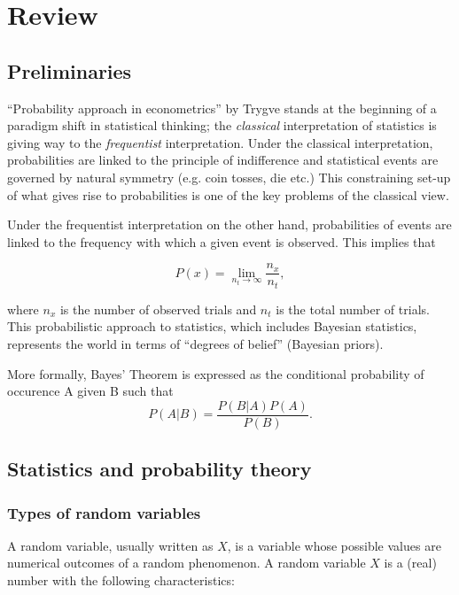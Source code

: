 \chapter{Review}\label{chap_Review}
\section{Preliminaries}\label{chap_Review:Prelim}
``Probability approach in econometrics'' by Trygve \citet{Haavelmo1944} stands at the beginning of a paradigm shift in statistical thinking; the \emph{classical} interpretation of statistics is giving way to the \emph{frequentist} interpretation. Under the classical interpretation, probabilities are linked to the principle of indifference and statistical events are governed by natural symmetry (e.g. coin tosses, die etc.) This constraining set-up of what gives rise to probabilities is one of the key problems of the classical view. 

Under the frequentist interpretation on the other hand, probabilities of events are linked to the frequency with which a given event is observed. This implies that

$$P(x)= \lim\limits_{n_{t} \rightarrow \infty} \frac{n_{x}}{n_{t}},$$ 

where $n_{x}$ is the number of observed trials and $n_{t}$ is the total number of trials. This probabilistic approach to statistics, which includes Bayesian statistics, represents the world in terms of ``degrees of belief'' (Bayesian priors).

More formally, Bayes' Theorem is expressed as the conditional probability of occurence A given B such that $$P(A|B) = \frac{P(B|A)P(A)}{P(B)}.$$


\section{Statistics and probability theory}\label{chap_Review:Stats}
\subsection{Types of random variables}
A random variable, usually written as $X$, is a variable whose possible values are numerical outcomes of a random phenomenon. A random variable $X$  is a (real) number with the following characteristics:

